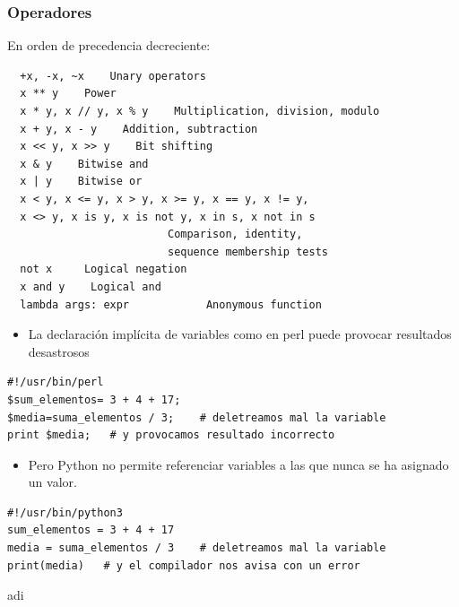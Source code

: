 \begin{frame}[fragile]
  \begin{center}
\frametitle{Operadores }
En orden de precedencia decreciente:
  \end{center}
  

  \begin{footnotesize}
\begin{verbatim}
  +x, -x, ~x    Unary operators
  x ** y    Power 
  x * y, x // y, x % y    Multiplication, division, modulo
  x + y, x - y    Addition, subtraction
  x << y, x >> y    Bit shifting
  x & y    Bitwise and
  x | y    Bitwise or
  x < y, x <= y, x > y, x >= y, x == y, x != y,
  x <> y, x is y, x is not y, x in s, x not in s  
                         Comparison, identity, 
                         sequence membership tests
  not x     Logical negation
  x and y    Logical and
  lambda args: expr            Anonymous function
\end{verbatim}
  \end{footnotesize}

\end{frame}

\begin{frame}[fragile]

\begin{itemize}
  
\item 
La declaración implícita de variables como en perl puede provocar resultados desastrosos
\end{itemize}

\begin{footnotesize}
\begin{verbatim}
#!/usr/bin/perl
$sum_elementos= 3 + 4 + 17;
$media=suma_elementos / 3;    # deletreamos mal la variable
print $media;   # y provocamos resultado incorrecto
\end{verbatim}
\end{footnotesize}

\begin{itemize}
\item 
Pero Python no permite referenciar variables a las que nunca se ha
asignado un valor.
\end{itemize}
\begin{footnotesize}
\begin{verbatim}
#!/usr/bin/python3
sum_elementos = 3 + 4 + 17
media = suma_elementos / 3    # deletreamos mal la variable
print(media)   # y el compilador nos avisa con un error
\end{verbatim}
\end{footnotesize}
adi

\end{frame}


